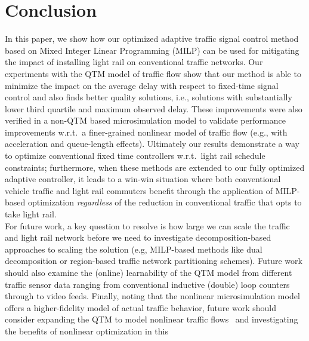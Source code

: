 \section{Conclusion}

In this paper, we show how our optimized adaptive traffic signal
control method based on Mixed Integer Linear Programming (MILP) can be
used for mitigating the impact of installing light rail on
conventional traffic networks.  Our experiments with the QTM model of
traffic flow show that our method is able to minimize the impact on
the average delay with respect to fixed-time signal control and also
finds better quality solutions, i.e., solutions with substantially
lower third quartile and maximum observed delay.  These improvements
were also verified in a non-QTM based microsimulation model to
validate performance improvements w.r.t.\ a finer-grained nonlinear
model of traffic flow (e.g., with acceleration and queue-length
effects).
%
%
Ultimately our results demonstrate a way to optimize conventional
fixed time controllers w.r.t.\ light rail schedule constraints;
furthermore, when these methods are extended to our fully optimized
adaptive controller, it leads to a win-win situation where both
conventional vehicle traffic and light rail commuters benefit through
the application of MILP-based optimization \emph{regardless} of the
reduction in conventional traffic that opts to take light rail. \\
%
\indent For future work, a key question to resolve is how large we can scale
the traffic and light rail network before we need to investigate
decomposition-based approaches to scaling the solution 
(e.g, 
MILP-based methods like dual decomposition or region-based
traffic network partitioning schemes).
Future
work should also examine the (online) learnability of the QTM model
from different traffic sensor data ranging from conventional inductive
(double) loop counters through to video feeds.  Finally, noting that
the nonlinear microsimulation model offers a higher-fidelity model of actual
traffic behavior, future work should consider expanding the QTM to
model nonlinear traffic
flows~\cite{lu2011discrete,muralidharan2009freeway,kim2002online,huang2011traffic}
and investigating the benefits of nonlinear optimization in this
